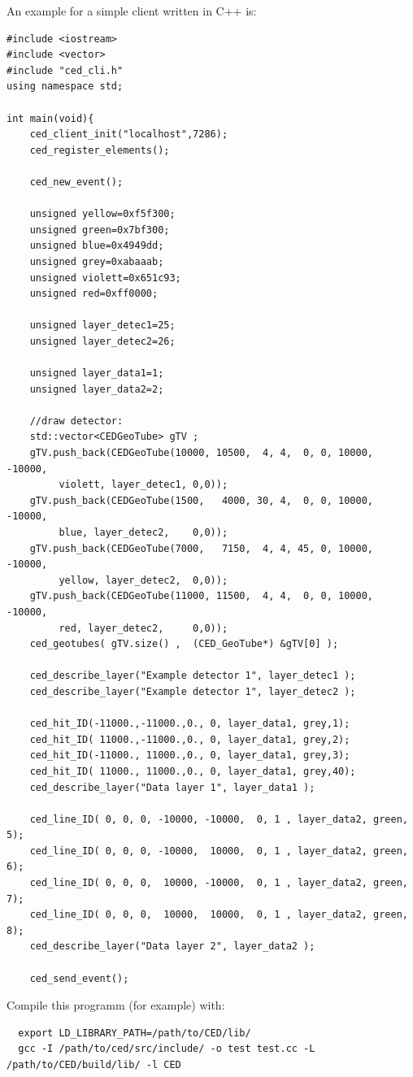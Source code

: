 \documentclass[a4paper,10pt]{article}
\begin{document}
An example for a simple client written in C++ is:
\begin{verbatim}
#include <iostream>
#include <vector>
#include "ced_cli.h"
using namespace std;

int main(void){
    ced_client_init("localhost",7286);
    ced_register_elements();

    ced_new_event();

    unsigned yellow=0xf5f300;
    unsigned green=0x7bf300;
    unsigned blue=0x4949dd;
    unsigned grey=0xabaaab;
    unsigned violett=0x651c93;
    unsigned red=0xff0000;

    unsigned layer_detec1=25;
    unsigned layer_detec2=26;

    unsigned layer_data1=1;
    unsigned layer_data2=2;

    //draw detector:
    std::vector<CEDGeoTube> gTV ;
    gTV.push_back(CEDGeoTube(10000, 10500,  4, 4,  0, 0, 10000, -10000, 
         violett, layer_detec1, 0,0));
    gTV.push_back(CEDGeoTube(1500,   4000, 30, 4,  0, 0, 10000, -10000, 
         blue, layer_detec2,    0,0));
    gTV.push_back(CEDGeoTube(7000,   7150,  4, 4, 45, 0, 10000, -10000, 
         yellow, layer_detec2,  0,0));
    gTV.push_back(CEDGeoTube(11000, 11500,  4, 4,  0, 0, 10000, -10000, 
         red, layer_detec2,     0,0));
    ced_geotubes( gTV.size() ,  (CED_GeoTube*) &gTV[0] );

    ced_describe_layer("Example detector 1", layer_detec1 );
    ced_describe_layer("Example detector 1", layer_detec2 );

    ced_hit_ID(-11000.,-11000.,0., 0, layer_data1, grey,1);
    ced_hit_ID( 11000.,-11000.,0., 0, layer_data1, grey,2);
    ced_hit_ID(-11000., 11000.,0., 0, layer_data1, grey,3);
    ced_hit_ID( 11000., 11000.,0., 0, layer_data1, grey,40);
    ced_describe_layer("Data layer 1", layer_data1 );

    ced_line_ID( 0, 0, 0, -10000, -10000,  0, 1 , layer_data2, green, 5);
    ced_line_ID( 0, 0, 0, -10000,  10000,  0, 1 , layer_data2, green, 6);
    ced_line_ID( 0, 0, 0,  10000, -10000,  0, 1 , layer_data2, green, 7);
    ced_line_ID( 0, 0, 0,  10000,  10000,  0, 1 , layer_data2, green, 8);
    ced_describe_layer("Data layer 2", layer_data2 );

    ced_send_event();
\end{verbatim}

Compile this programm (for example) with:
\begin{verbatim}
  export LD_LIBRARY_PATH=/path/to/CED/lib/
  gcc -I /path/to/ced/src/include/ -o test test.cc -L /path/to/CED/build/lib/ -l CED
\end{verbatim}
\end{document}
